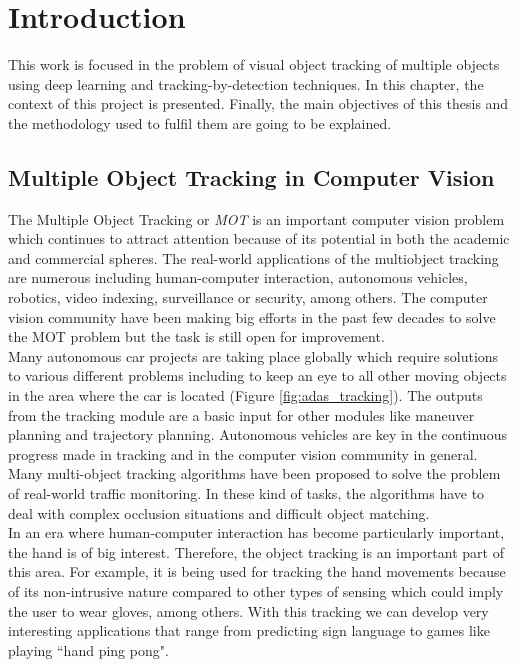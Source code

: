 \chapter{Introduction}\label{cap.introduccion}
\setlength{\parindent}{0pt}
This work is focused in the problem of visual object tracking of multiple objects using deep learning and tracking-by-detection techniques. In this chapter, the context of this project is presented. Finally, the main objectives of this thesis and the methodology used to fulfil them are going to be explained.

\section{Multiple Object Tracking in Computer Vision}
The Multiple Object Tracking or \textit{MOT} is an important computer vision problem which continues to attract attention because of its potential in both the academic and commercial spheres. The real-world applications of the multiobject tracking are numerous including human-computer interaction, autonomous vehicles, robotics, video indexing, surveillance or security, among others. The computer vision community have been making big efforts in the past few decades to solve the MOT problem but the task is still open for improvement.\\ Many autonomous car projects are taking place globally which require solutions to various different problems including to keep an eye to all other moving objects in the area where the car is located (Figure \ref{fig:adas_tracking}). The outputs from the tracking module are a basic input for other modules like maneuver planning and trajectory planning. Autonomous vehicles are key in the continuous progress made in tracking and in the computer vision community in general. Many multi-object tracking algorithms have been proposed to solve the problem of real-world traffic monitoring. In these kind of tasks, the algorithms have to deal with complex occlusion situations and difficult object matching.\\
In an era where human-computer interaction has become particularly important, the hand is of big interest. Therefore, the object tracking is an important part of this area. For example, it is being used for tracking the hand movements because of its non-intrusive nature compared to other types of sensing which could imply the user to wear gloves, among others. With this tracking we can develop very interesting applications that range from predicting sign language to games like playing ``hand ping pong".
